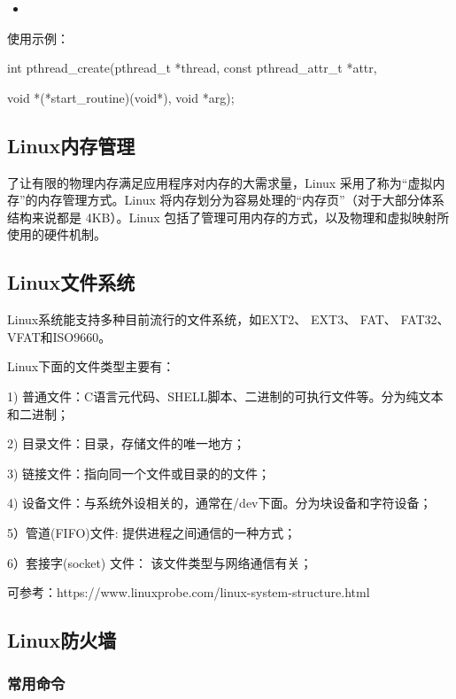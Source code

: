 \documentclass[UTF8]{article}%
\begin{document}
\begin{itemize}
    \item 
\end{itemize}

使用示例：



int pthread\_create(pthread\_t *thread, const pthread\_attr\_t *attr,

void *(*start\_routine)(void*), void *arg); 


\subsection{Linux内存管理}

了让有限的物理内存满足应用程序对内存的大需求量，Linux 采用了称为“虚拟内存”的内存管理方式。Linux 将内存划分为容易处理的“内存页”（对于大部分体系结构来说都是 4KB）。Linux 包括了管理可用内存的方式，以及物理和虚拟映射所使用的硬件机制。

\subsection{Linux文件系统}

Linux系统能支持多种目前流行的文件系统，如EXT2、 EXT3、 FAT、 FAT32、 VFAT和ISO9660。

Linux下面的文件类型主要有：

1) 普通文件：C语言元代码、SHELL脚本、二进制的可执行文件等。分为纯文本和二进制；

2) 目录文件：目录，存储文件的唯一地方；

3) 链接文件：指向同一个文件或目录的的文件；

4) 设备文件：与系统外设相关的，通常在/dev下面。分为块设备和字符设备；

5）管道(FIFO)文件: 提供进程之间通信的一种方式；

6）套接字(socket) 文件： 该文件类型与网络通信有关；

可参考：https://www.linuxprobe.com/linux-system-structure.html

\subsection{Linux防火墙}

\subsubsection{常用命令}
\end{document}
